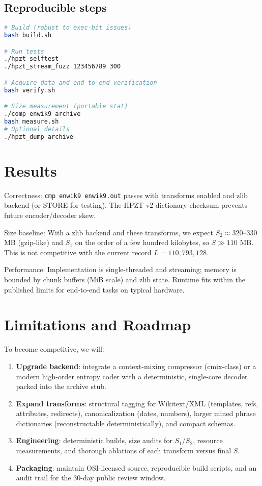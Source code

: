 \documentclass[11pt]{article}
\begin{document}
\subsection{Reproducible steps}
\begin{lstlisting}[language=bash]
# Build (robust to exec-bit issues)
bash build.sh

# Run tests
./hpzt_selftest
./hpzt_stream_fuzz 123456789 300

# Acquire data and end-to-end verification
bash verify.sh

# Size measurement (portable stat)
./comp enwik9 archive
bash measure.sh
# Optional details
./hpzt_dump archive
\end{lstlisting}

\section{Results}
Correctness: \texttt{cmp enwik9 enwik9.out} passes with transforms enabled and zlib backend (or STORE for testing). The HPZT v2 dictionary checksum prevents future encoder/decoder skew.

Size baseline: With a zlib backend and these transforms, we expect $S_2 \approx 320$--$330$ MB (gzip-like) and $S_1$ on the order of a few hundred kilobytes, so $S \gg 110$ MB. This is not competitive with the current record $L = 110{,}793{,}128$.

Performance: Implementation is single-threaded and streaming; memory is bounded by chunk buffers (MiB scale) and zlib state. Runtime fits within the published limits for end-to-end tasks on typical hardware.

\section{Limitations and Roadmap}
To become competitive, we will:
\begin{enumerate}[nosep]
  \item \textbf{Upgrade backend}: integrate a context-mixing compressor (cmix-class) or a modern high-order entropy coder with a deterministic, single-core decoder packed into the archive stub.
  \item \textbf{Expand transforms}: structural tagging for Wikitext/XML (templates, refs, attributes, redirects), canonicalization (dates, numbers), larger mined phrase dictionaries (reconstructable deterministically), and compact schemas.
  \item \textbf{Engineering}: deterministic builds, size audits for $S_1$/$S_2$, resource measurements, and thorough ablations of each transform versus final $S$.
  \item \textbf{Packaging}: maintain OSI-licensed source, reproducible build scripts, and an audit trail for the 30-day public review window.
\end{enumerate}
\end{document}
